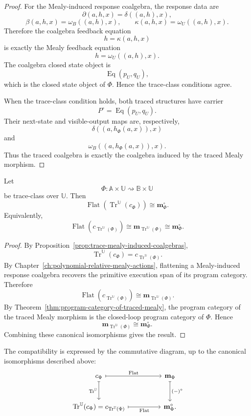 \begin{proof}
For the Mealy-induced response coalgebra, the response data are
\[
\partial(a,h,x)=\delta((a,h),x),
\]
\[
\beta(a,h,x)=\omega_B((a,h),x),
\qquad
\kappa(a,h,x)=\omega_U((a,h),x).
\]
Therefore the coalgebra feedback equation
\[
h=\kappa(a,h,x)
\]
is exactly the Mealy feedback equation
\[
h=\omega_U((a,h),x).
\]
The coalgebra closed state object is
\[
\operatorname{Eq}(p_U,q_U),
\]
which is the closed state object of \(\Phi\).  Hence the trace-class
conditions agree.

When the trace-class condition holds, both traced structures have carrier
\[
P^\circ=\operatorname{Eq}(p_U,q_U).
\]
Their next-state and visible-output maps are, respectively,
\[
\delta((a,h_\Phi(a,x)),x)
\]
and
\[
\omega_B((a,h_\Phi(a,x)),x).
\]
Thus the traced coalgebra is exactly the coalgebra induced by the traced Mealy
morphism.
\end{proof}

\begin{theorem}
\label{thm:flattening-commutes-feedback}
Let
\[
\Phi:
\mathbb A\times\mathbb U
\rightsquigarrow
\mathbb B\times\mathbb U
\]
be trace-class over \(\mathbb U\).  Then
\[
\operatorname{Flat}
\left(
\operatorname{Tr}^{\mathbb U}(c_\Phi)
\right)
\cong
\mathbf m_{\Phi}^{\circ}.
\]
Equivalently,
\[
\operatorname{Flat}
\left(c_{\operatorname{Tr}^{\mathbb U}(\Phi)}\right)
\cong
\mathbf m_{\operatorname{Tr}^{\mathbb U}(\Phi)}
\cong
\mathbf m_{\Phi}^{\circ}.
\]
\end{theorem}

\begin{proof}
By Proposition~\ref{prop:trace-mealy-induced-coalgebras},
\[
\operatorname{Tr}^{\mathbb U}(c_\Phi)
=
c_{\operatorname{Tr}^{\mathbb U}(\Phi)}.
\]
By Chapter~\ref{ch:polynomial-relative-mealy-actions}, flattening a
Mealy-induced response coalgebra recovers the primitive execution span of its
program category.  Therefore
\[
\operatorname{Flat}
\left(c_{\operatorname{Tr}^{\mathbb U}(\Phi)}\right)
\cong
\mathbf m_{\operatorname{Tr}^{\mathbb U}(\Phi)}.
\]
By Theorem~\ref{thm:program-category-of-traced-mealy}, the program category of
the traced Mealy morphism is the closed-loop program category of \(\Phi\).
Hence
\[
\mathbf m_{\operatorname{Tr}^{\mathbb U}(\Phi)}
\cong
\mathbf m_{\Phi}^{\circ}.
\]
Combining these canonical isomorphisms gives the result.
\end{proof}

The compatibility is expressed by the commutative diagram, up to the canonical
isomorphisms described above:
\[
\begin{tikzcd}[column sep=huge,row sep=large]
c_{\Phi}
  \arrow[r, maps to, "{\operatorname{Flat}}"]
  \arrow[d, maps to, "{\operatorname{Tr}^{\mathbb U}}"']
&
\mathbf m_{\Phi}
  \arrow[d, maps to, "{(-)^\circ}"]
\\
\operatorname{Tr}^{\mathbb U}(c_\Phi)
=
c_{\operatorname{Tr}^{\mathbb U}(\Phi)}
  \arrow[r, maps to, "{\operatorname{Flat}}"']
&
\mathbf m_{\Phi}^{\circ}.
\end{tikzcd}
\]

